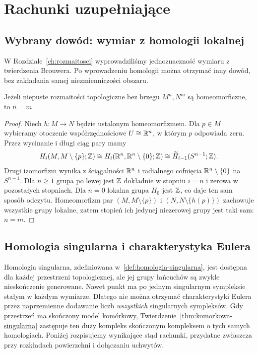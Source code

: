 \chapter{Rachunki uzupełniające}
\label{app:homologia-singularna-euler}

\section{Wybrany dowód: wymiar z homologii lokalnej}
\label{sec:local-dimension-appendix}

W Rozdziale~\ref{ch:rozmaitosci}
wyprowadziliśmy jednoznaczność
wymiaru z twierdzenia Brouwera.
Po wprowadzeniu homologii
można otrzymać inny dowód,
bez zakładania samej
niezmienniczości obszaru.

\begin{stwierdzenie}
\label{prop:dimension-local-homology}
Jeżeli niepuste rozmaitości
topologiczne bez brzegu
$M^n,N^m$ są homeomorficzne,
to $n=m$.
\end{stwierdzenie}
\begin{proof}
Niech $h:M\to N$ będzie ustalonym homeomorfizmem.
Dla $p\in M$ wybieramy otoczenie współrzędnościowe
$U\cong\mathbb{R}^n$, w którym $p$ odpowiada zeru. Przez
wycinanie i długi ciąg
pary mamy
\[
 H_i(M,M\setminus\{p\};\mathbb{Z})
 \cong H_i(\mathbb{R}^n,\mathbb{R}^n\setminus\{0\};\mathbb{Z})
 \cong\widetilde H_{i-1}(S^{n-1};\mathbb{Z}).
\]
Drugi izomorfizm wynika z
ściągalności $\mathbb{R}^n$
i radialnego cofnięcia
$\mathbb{R}^n\setminus\{0\}$
na $S^{n-1}$.
Dla $n\geq1$ grupa
po lewej jest $\mathbb{Z}$
dokładnie w stopniu $i=n$
i zerowa w pozostałych
stopniach. Dla $n=0$
lokalna grupa $H_0$
jest $\mathbb{Z}$, co daje
ten sam sposób odczytu.
Homeomorfizm par
$(M,M\setminus\{p\})$
i $(N,N\setminus\{h(p)\})$
zachowuje wszystkie
grupy lokalne, zatem
stopień ich jedynej
niezerowej grupy jest
taki sam: $n=m$.
\end{proof}


\section{Homologia singularna i charakterystyka Eulera}

Homologia singularna, zdefiniowana w~\ref{def:homologia-singularna},
jest dostępna dla każdej przestrzeni topologicznej, ale jej grupy
łańcuchów są zwykle nieskończenie generowane. Nawet punkt ma po jednym
singularnym sympleksie stałym w każdym wymiarze. Dlatego nie można
otrzymać charakterystyki Eulera przez naprzemienne dodawanie liczb
\emph{wszystkich} singularnych sympleksów. Gdy przestrzeń ma skończony
model komórkowy, Twierdzenie~\ref{thm:komorkowa-singularna} zastępuje
ten duży kompleks skończonym kompleksem o tych samych homologiach.
Poniżej rozpisujemy wynikające stąd rachunki, przydatne zwłaszcza
przy rozkładach powierzchni i dołączaniu uchwytów.

